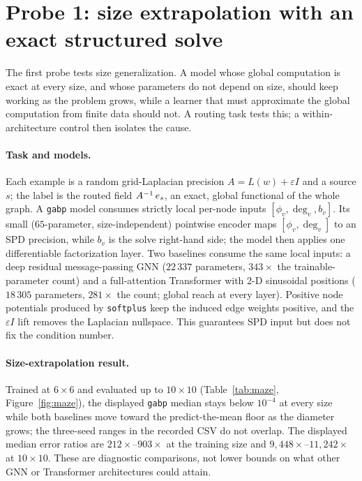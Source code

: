 \section{Probe 1: size extrapolation with an exact structured solve}
\label{sec:maze}

The first probe tests size generalization. A model whose global computation is
exact at every size, and whose parameters do not depend on size, should keep working as
the problem grows, while a learner that must approximate the global
computation from finite data should not. A routing task tests this; a
within-architecture control then isolates the cause.

\paragraph{Task and models.}
Each example is a random grid-Laplacian precision $A = L(w) + \varepsilon I$
and a source $s$; the label is the routed field $A^{-1}\,e_s$, an exact,
global functional of the whole graph. A \texttt{gabp} model consumes strictly
local per-node inputs $[\phi_v, \deg_v, b_v]$. Its small ($65$-parameter,
size-independent) pointwise encoder maps $[\phi_v,\deg_v]$ to an SPD
precision, while $b_v$ is the solve right-hand side; the model then applies
one differentiable factorization layer. Two baselines consume the same local
inputs: a deep residual message-passing GNN ($22\,337$ parameters,
$343\times$ the trainable-parameter count)
and a full-attention Transformer with 2-D sinusoidal positions ($18\,305$
parameters, $281\times$ the count; global reach at every layer). Positive node
potentials produced by \texttt{softplus} keep the induced edge weights
positive, and the $\varepsilon I$ lift removes the Laplacian nullspace. This
guarantees SPD input but does not fix the condition number.

\paragraph{Size-extrapolation result.}
Trained at $6\times6$ and evaluated up to $10\times10$ (Table~\ref{tab:maze},
Figure~\ref{fig:maze}), the displayed \texttt{gabp} median stays below
$10^{-4}$ at every size while both baselines move toward the predict-the-mean
floor as the diameter grows; the three-seed ranges in the recorded CSV do not
overlap. The
displayed median error ratios are $212\times$--$903\times$ at the training
size and $9{,}448\times$--$11{,}242\times$ at $10\times10$. These are
diagnostic comparisons, not lower bounds on what other GNN or Transformer
architectures could attain.

